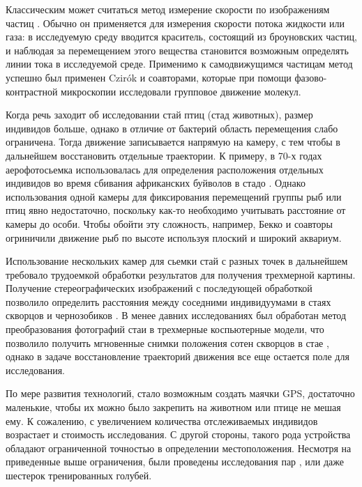 	Классическим может считаться метод измерение скорости по изображениям частиц \cite{raffel2007}. Обычно он применяется для измерения скорости потока жидкости или газа: в исследуемую среду вводится краситель, состоящий из броуновских частиц, и наблюдая за перемещением этого вещества становится возможным определять линии тока в исследуемой среде. Применимо к самодвижущимся частицам метод успешно был применен Czir\'{o}k и соавторами\cite{csahok1997}, которые при помощи фазово-контрастной микроскопии исследовали групповое движение молекул.

	Когда речь заходит об исследовании стай птиц (стад животных), размер индивидов больше, однако в отличие от бактерий область перемещения слабо ограничена. Тогда движение записывается напрямую на камеру, с тем чтобы в дальнейшем восстановить отдельные траектории. К примеру, в 70-х годах аерофотосьемка использовалась для определения расположения отдельных индивидов во время сбивания африканских буйволов в стадо \cite{sinclair1977}. Однако использования одной камеры для фиксирования перемещений группы рыб или птиц явно недостаточно, поскольку как-то необходимо учитывать расстояние от камеры до особи. Чтобы обойти эту сложность, например, Бекко и соавторы \cite{becco2006} огриничили движение рыб по высоте используя плоский и широкий аквариум.

	Использование нескольких камер для сьемки стай с разных точек в дальнейшем требовало трудоемкой обработки результатов для получения трехмерной картины. Получение стереографических изображений с последующей обработкой позволило определить расстояния между соседними индивидуумами в стаях скворцов и чернозобиков \cite{major1978}. В менее давних исследованиях был обработан метод преобразования фотографий стаи в трехмерные коспьютерные модели, что позволило получить мгновенные снимки положения сотен скворцов в стае \cite{ballerini2008}, однако в задаче восстановление траекторий движения все еще остается поле для исследования.

	По мере развития технологий, стало возможным создать маячки GPS, достаточно маленькие, чтобы их можно было закрепить на животном или птице не мешая ему. К сожалению, с увеличением количества отслеживаемых индивидов возрастает и стоимость исследования. С другой стороны, такого рода устройства обладают ограниченной точностью в определении местоположения. Несмотря на приведенные выше ограничения, были проведены исследования пар \cite{biro2006,nagy2010}, или даже шестерок \cite{dellariccia2008} тренированных голубей.

